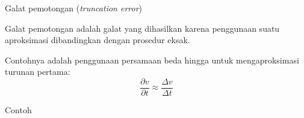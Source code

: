 \begin{frame}{Galat pemotongan (\textit{truncation error})}

Galat pemotongan adalah galat yang dihasilkan karena penggunaan
suatu aproksimasi dibandingkan dengan prosedur eksak.

Contohnya adalah penggunaan persamaan beda hingga untuk mengaproksimasi
turunan pertama:
$$
\frac{\partial v}{\partial t} \approx \frac{\Delta v}{\Delta t}
$$

\end{frame}




\begin{frame}{Contoh}

\end{frame}